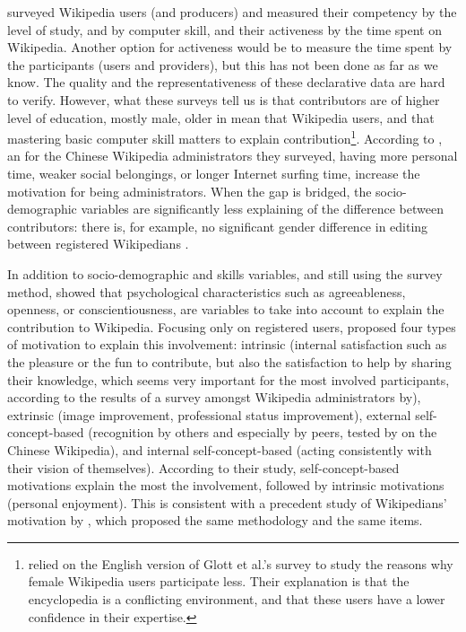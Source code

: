 \citet{GlottSchmidtGhosh10} surveyed Wikipedia users (and producers)
and measured their competency by the level of study, and by computer
skill, and their activeness by the time spent on Wikipedia. Another
option for activeness would be to measure the time spent by the participants
(users and providers), but this has not been done as far as we know.
The quality and the representativeness of these declarative data are
hard to verify. However, what these surveys tell us is that contributors
are of higher level of education, mostly male, older in mean that
Wikipedia users, and that mastering basic computer skill matters to
explain contribution\footnote{\citet{CollierBear12} relied on the English version of Glott et al.'s
survey to study the reasons why female Wikipedia users participate
less. Their explanation is that the encyclopedia is a conflicting
environment, and that these users have a lower confidence in their
expertise.}. According to \citet{LiangChenHsu08}, an for the Chinese Wikipedia
administrators they surveyed, having more personal time, weaker social
belongings, or longer Internet surfing time, increase the motivation
for being administrators. When the gap is bridged, the socio-demographic
variables are significantly less explaining of the difference between
contributors: there is, for example, no significant gender difference
in editing between registered Wikipedians \citep[in the English Wikipedia,][]{Antinetal11}. 

In addition to socio-demographic and skills variables, and still using
the survey method, \citet{Amichai-Hamburgeretal08} showed that psychological
characteristics such as agreeableness, openness, or conscientiousness,
are variables to take into account to explain the contribution to
Wikipedia. Focusing only on registered users, \citet{YangLai10} proposed
four types of motivation to explain this involvement: intrinsic (internal
satisfaction such as the pleasure or the fun to contribute, but also
the satisfaction to help by sharing their knowledge, which seems very
important for the most involved participants, according to the results
of a survey amongst Wikipedia administrators by\citealp{BaytiyehPfaffman10}),
extrinsic (image improvement, professional status improvement), external
self-concept-based (recognition by others and especially by peers,
tested by \citet{ZhangZhu11} on the Chinese Wikipedia), and internal
self-concept-based (acting consistently with their vision of themselves).
According to their study, self-concept-based motivations explain the
most the involvement, followed by intrinsic motivations (personal
enjoyment). This is consistent with a precedent study of Wikipedians'
motivation by \citet{Nov07}, which proposed the same methodology
and the same items.

